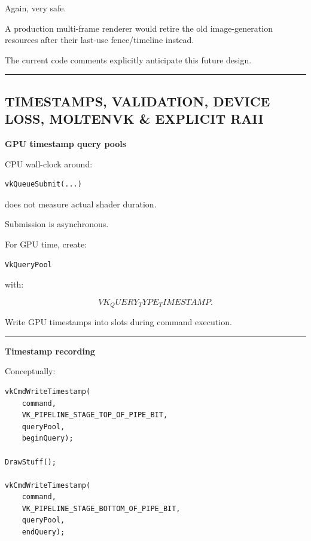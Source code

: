 Again, very safe.

A production multi-frame renderer would retire the old image-generation resources after their last-use fence/timeline instead.

The current code comments explicitly anticipate this future design.

\begin{center}\rule{0.5\linewidth}{0.5pt}\end{center}

\subsection{TIMESTAMPS, VALIDATION, DEVICE LOSS, MOLTENVK \& EXPLICIT RAII}\label{01-foundations-i-ch014-timestamps-validation-device-loss-moltenvk-explicit-raii}

\hypertarget{01-foundations-i-ch014-timestamps-validation-device-loss-moltenvk-explicit-raii}{}

\textbf{GPU timestamp query pools}

CPU wall-clock around:

\begin{verbatim}
vkQueueSubmit(...)
\end{verbatim}

does not measure actual shader duration.

Submission is asynchronous.

For GPU time, create:

\begin{verbatim}
VkQueryPool
\end{verbatim}

with:

\[
VK_QUERY_TYPE_TIMESTAMP.
\]

Write GPU timestamps into slots during command execution.

\begin{center}\rule{0.5\linewidth}{0.5pt}\end{center}

\textbf{Timestamp recording}

Conceptually:

\begin{verbatim}
vkCmdWriteTimestamp(
    command,
    VK_PIPELINE_STAGE_TOP_OF_PIPE_BIT,
    queryPool,
    beginQuery);

DrawStuff();

vkCmdWriteTimestamp(
    command,
    VK_PIPELINE_STAGE_BOTTOM_OF_PIPE_BIT,
    queryPool,
    endQuery);
\end{verbatim}

